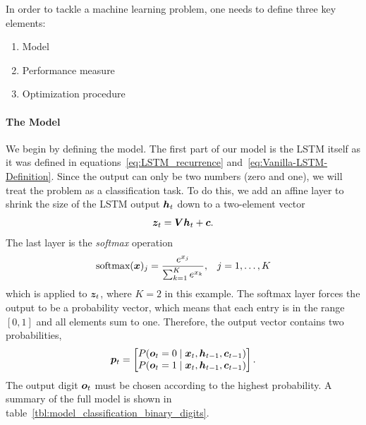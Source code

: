 		In order to tackle a machine learning problem, one needs to define three key elements:
		\begin{enumerate}
			\item Model
			\item Performance measure
			\item Optimization procedure
		\end{enumerate}
	
		\paragraph{The Model}
		We begin by defining the model.
		The first part of our model is the LSTM itself as it was defined in equations~\ref{eq:LSTM_recurrence} and~\ref{eq:Vanilla-LSTM-Definition}.
		Since the output can only be two numbers (zero and one), we will treat the problem as a classification task.
		To do this, we add an affine layer to shrink the size of the LSTM output $\bm{h}_t$ down to a two-element vector
		\begin{equation}
			\bm{z}_t = \bm{V} \bm{h}_t + \bm{c}.
		\end{equation}
		The last layer is the \emph{softmax} operation
		\begin{eqnarray}
			\text{softmax}(\bm{x})_j = \frac{e^{x_{j}}}{\sum_{k=1}^{K} e^{x_{k}}},  & & j = 1, \dots, K
		\end{eqnarray}
		which is applied to $\bm{z}_t$, where $K = 2$ in this example.
		The softmax layer forces the output to be a probability vector, which means that each entry is in the range $[0, 1]$ and all elements sum to one.
		Therefore, the output vector contains two probabilities, 
		\begin{equation*}
			\bm{p}_t = 
			\begin{bmatrix}
				P(\bm{o}_t = 0 \mid \bm{x}_t, \bm{h}_{t - 1}, \bm{c}_{t - 1}) \\ 
				P(\bm{o}_t = 1 \mid \bm{x}_t, \bm{h}_{t - 1}, \bm{c}_{t - 1})
			\end{bmatrix}.
		\end{equation*}
		The output digit $\bm{o}_t$ must be chosen according to the highest probability.
		A summary of the full model is shown in table~\ref{tbl:model_classification_binary_digits}.
